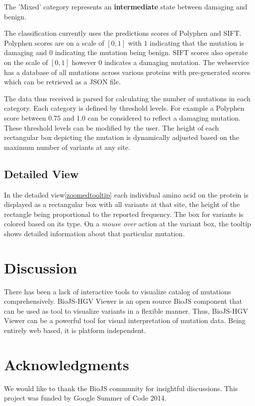 \documentclass[twoside]{article}
\begin{document}
\begin{multicols}{2}
The 'Mixed' category represents an \textbf{intermediate} state between damaging and benign.


The classification currently uses the predictions scores of Polyphen\cite{Ramensky2002} and SIFT\cite{Kumar2009}. Polyphen scores are on a scale of $[0,1]$ with $1$ indicating that the mutation is damaging and $0$ indicating the mutation being benign. SIFT scores also operate on the scale of $[0,1]$ however $0$ indicates a damaging mutation.
The webservice has a database of all mutations across various proteins with pre-generated scores which can be retrieved as a JSON file.

The data thus received is parsed for calculating the number of mutations in each category. Each category is defined by threshold levels. For example a Polyphen score between 0.75 and 1.0 can be considered to reflect a damaging mutation. These threshold levels can be modified by the user. The height of each rectangular box depicting the mutation is dynamically adjusted based on the maximum number of variants at any site.


\subsection{Detailed View}
In the detailed view\ref{zoomedtooltip} each individual amino acid on the protein is displayed as a rectangular box with all variants at that site, the height of the rectangle being proportional to the reported frequency. The box for variants is colored based on its type. On a \textit{mouse over} action at the variant box, the tooltip shows detailed information about that particular mutation.


\section{Discussion}
There has been a lack of interactive tools to visualize catalog of mutations comprehensively. BioJS-HGV Viewer is an open source BioJS component that can be used as tool to visualize variants in a flexible manner. Thus, BioJS-HGV Viewer can be a powerful tool for visual interpretation of mutation data. Being entirely web based, it is platform independent.




\section{Acknowledgments}
We would like to thank the BioJS community for insightful discussions. This project was funded by Google Summer of Code 2014.







\end{multicols}
\end{document}
